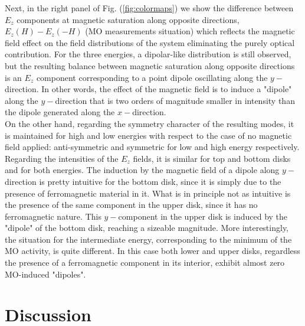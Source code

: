Next, in the right panel of Fig. (\ref{fig:colormaps}) we show the difference between $E_z$ components at magnetic saturation along opposite directions, $E_{z}(H)-E_{z}(-H)$ (MO measurements situation) which reflects the magnetic field effect on the field distributions of the system eliminating the purely optical contribution. For the three energies, a dipolar-like distribution is still observed, but the resulting balance between magnetic saturation along opposite directions is an $E_{z}$ component corresponding to a point dipole oscillating along the $y-$direction. In other words, the effect of the magnetic field is to induce a "dipole" along the $y-$direction that is two orders of magnitude smaller in intensity than the dipole generated along the $x-$direction.\\
On the other hand, regarding the symmetry character of the resulting modes, it is maintained for high and low energies with respect to the case of no magnetic field applied: anti-symmetric and symmetric for low and high energy respectively. Regarding the intensities of the $E_{z}$ fields, it is similar for top and bottom disks and for both energies. The induction by the magnetic field of a dipole along $y-$direction is pretty intuitive for the bottom disk, since it is simply due to the presence of ferromagnetic material in it. What is in principle not as intuitive is the presence of the same component in the upper disk, since it has no ferromagnetic nature. This $y-$component in the upper disk is induced by the "dipole" of the bottom disk, reaching a sizeable magnitude. More interestingly, the situation for the intermediate energy, corresponding to the minimum of the MO activity, is quite different. In this case both lower and upper disks, regardless the presence of a ferromagnetic component in its interior, exhibit almost zero MO-induced "dipoles".

\section{Discussion\label{sec:chap3_discussion}}


